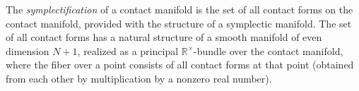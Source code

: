 The \textit{symplectification} of a contact manifold is the set of all contact forms on the contact manifold, provided with the structure of a symplectic manifold. The set of all contact forms has a natural structure of a smooth manifold of even dimension $N+1$, realized as a principal $\mathbb{R}^\times$-bundle over the contact manifold, where the fiber over a point consists of all contact forms at that point (obtained from each other by multiplication by a nonzero real number).
